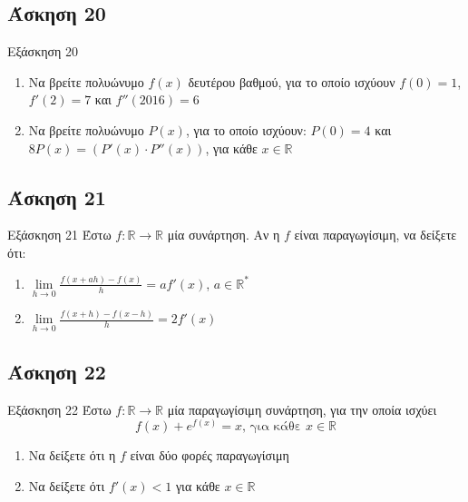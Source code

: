 \documentclass[greek]{beamer}
\begin{document}
\subsection{Άσκηση 20}
\begin{frame}[label=Άσκηση20]{Εξάσκηση 20}
 \begin{enumerate}
  \item<1->  Να βρείτε πολυώνυμο $f(x)$ δευτέρου βαθμού, για το οποίο ισχύουν $f(0)=1$, $f'(2)=7$ και $f''(2016)=6$
  \item<2-> Να βρείτε πολυώνυμο $P(x)$, για το οποίο ισχύουν: $P(0)=4$ και $8P(x)=\left( P'(x)\cdot P''(x) \right) $, για κάθε $x\in\mathbb{R}$
 \end{enumerate}

\end{frame}

\subsection{Άσκηση 21}
\begin{frame}[label=Άσκηση21]{Εξάσκηση 21}
 Έστω $f:\mathbb{R}\to\mathbb{R}$ μία συνάρτηση. Αν η $f$ είναι παραγωγίσιμη, να δείξετε ότι:
 \begin{enumerate}
  \item<1-> $\lim\limits_{h \to 0}{ \frac{f(x+ah)-f(x)}{h} }=af'(x)$, $a\in\mathbb{R}^*$
  \item<2-> $\lim\limits_{h \to 0}{ \frac{f(x+h)-f(x-h)}{h} }=2f'(x)$
 \end{enumerate}

\end{frame}

\subsection{Άσκηση 22}
\begin{frame}[label=Άσκηση22]{Εξάσκηση 22}
 Έστω $f:\mathbb{R}\to\mathbb{R}$ μία παραγωγίσιμη συνάρτηση, για την οποία ισχύει
 $$f(x)+e^{f(x)}=x \text{, για κάθε } x\in\mathbb{R}$$
 \begin{enumerate}
  \item<1-> Να δείξετε ότι η $f$ είναι δύο φορές παραγωγίσιμη
  \item<2-> Να δείξετε ότι $f'(x)<1$ για κάθε $x\in\mathbb{R}$
 \end{enumerate}

\end{frame}
\end{document}
